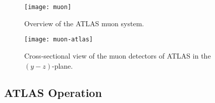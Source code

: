 \begin{figure}[htb!]
\centering
\texttt{[image: muon]}
\caption{Overview of the ATLAS muon system.}%
\label{fig:exp.atlas.muon.all}
\end{figure} 


\begin{figure}[htb!]
\centering
\texttt{[image: muon-atlas]}
\caption{Cross-sectional view of the muon detectors of ATLAS in the $\left(y-z\right)$-plane.}%
\label{fig:exp.atlas.muon}
\end{figure} 

\subsection{ATLAS Operation}








